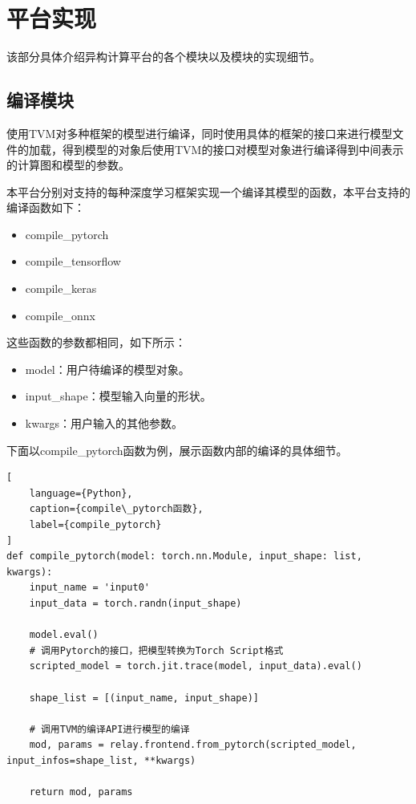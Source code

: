 \section{平台实现}

该部分具体介绍异构计算平台的各个模块以及模块的实现细节。

\subsection{编译模块}

使用TVM对多种框架的模型进行编译，同时使用具体的框架的接口来进行模型文件的加载，得到模型的对象后使用TVM的接口对模型对象进行编译得到中间表示的计算图和模型的参数。

本平台分别对支持的每种深度学习框架实现一个编译其模型的函数，本平台支持的编译函数如下：
\begin{itemize}
    \item {compile\_pytorch}
    \item {compile\_tensorflow}
    \item {compile\_keras}
    \item {compile\_onnx}
\end{itemize}

这些函数的参数都相同，如下所示：
\begin{itemize}
    \item {model：用户待编译的模型对象。}
    \item {input\_shape：模型输入向量的形状。}
    \item {kwargs：用户输入的其他参数。}
\end{itemize}

下面以compile\_pytorch函数为例，展示函数内部的编译的具体细节。

\begin{lstlisting}[
    language={Python},
    caption={compile\_pytorch函数},
    label={compile_pytorch}
]
def compile_pytorch(model: torch.nn.Module, input_shape: list, kwargs):
    input_name = 'input0'
    input_data = torch.randn(input_shape)
    
    model.eval()
    # 调用Pytorch的接口，把模型转换为Torch Script格式
    scripted_model = torch.jit.trace(model, input_data).eval()

    shape_list = [(input_name, input_shape)]

    # 调用TVM的编译API进行模型的编译
    mod, params = relay.frontend.from_pytorch(scripted_model, input_infos=shape_list, **kwargs)

    return mod, params
\end{lstlisting}


